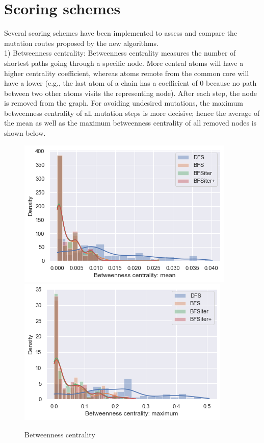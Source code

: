 \section{Scoring schemes}

Several scoring schemes have been implemented to assess and compare
the mutation routes proposed by the new algorithms.\\
1) Betweenness centrality: Betweenness centrality measures the number
of shortest paths going through a specific node\cite{Newman.2010}. More central atoms
will have a higher centrality coefficient, whereas atoms remote from
the common core will have a lower (e.g., the last atom of a chain
has a coefficient of 0 because no path between two other atoms visits
the representing node). After each step, the node is removed from
the graph.
For avoiding undesired mutations, the maximum betweenness centrality
of all mutation steps is more decisive; hence the average of the mean
as well as the maximum betweenness centrality of all removed nodes
is shown below.

\begin{figure}[H]
	
	\includegraphics[scale=0.8]{betweenness_mean_all}\includegraphics[scale=0.8]{betweenness_max_all}\caption{Betweenness centrality}
	
\end{figure}

